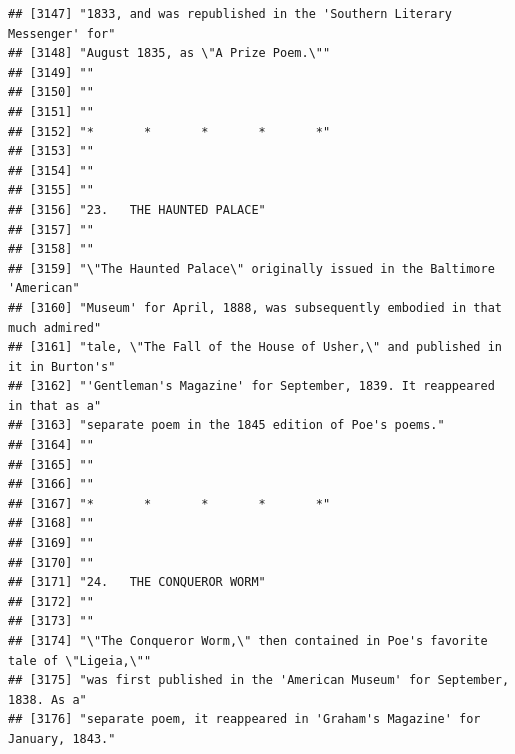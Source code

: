 \documentclass{article}\usepackage[]{graphicx}\usepackage[]{color}
\makeatletter
\newenvironment{kframe}{%
 \def\at@end@of@kframe{}%
 \ifinner\ifhmode%
  \def\at@end@of@kframe{\end{minipage}}%
  \begin{minipage}{\columnwidth}%
 \fi\fi%
 \def\FrameCommand##1{\hskip\@totalleftmargin \hskip-\fboxsep
 \colorbox{shadecolor}{##1}\hskip-\fboxsep
     \hskip-\linewidth \hskip-\@totalleftmargin \hskip\columnwidth}%
 \MakeFramed {\advance\hsize-\width
   \@totalleftmargin\z@ \linewidth\hsize
   \@setminipage}}%
 {\par\unskip\endMakeFramed%
 \at@end@of@kframe}
\newenvironment{knitrout}{}{} %
\makeatother
\begin{document}
\begin{knitrout}
\begin{kframe}
\begin{verbatim}
## [3147] "1833, and was republished in the 'Southern Literary Messenger' for"          
## [3148] "August 1835, as \"A Prize Poem.\""                                           
## [3149] ""                                                                            
## [3150] ""                                                                            
## [3151] ""                                                                            
## [3152] "*       *       *       *       *"                                           
## [3153] ""                                                                            
## [3154] ""                                                                            
## [3155] ""                                                                            
## [3156] "23.   THE HAUNTED PALACE"                                                    
## [3157] ""                                                                            
## [3158] ""                                                                            
## [3159] "\"The Haunted Palace\" originally issued in the Baltimore 'American"         
## [3160] "Museum' for April, 1888, was subsequently embodied in that much admired"     
## [3161] "tale, \"The Fall of the House of Usher,\" and published in it in Burton's"   
## [3162] "'Gentleman's Magazine' for September, 1839. It reappeared in that as a"      
## [3163] "separate poem in the 1845 edition of Poe's poems."                           
## [3164] ""                                                                            
## [3165] ""                                                                            
## [3166] ""                                                                            
## [3167] "*       *       *       *       *"                                           
## [3168] ""                                                                            
## [3169] ""                                                                            
## [3170] ""                                                                            
## [3171] "24.   THE CONQUEROR WORM"                                                    
## [3172] ""                                                                            
## [3173] ""                                                                            
## [3174] "\"The Conqueror Worm,\" then contained in Poe's favorite tale of \"Ligeia,\""
## [3175] "was first published in the 'American Museum' for September, 1838. As a"      
## [3176] "separate poem, it reappeared in 'Graham's Magazine' for January, 1843."      

\end{verbatim}
\end{kframe}
\end{knitrout}
\end{document}
